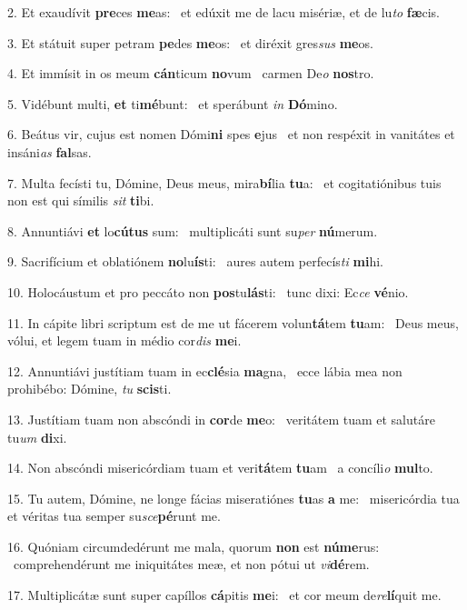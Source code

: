 2. Et exaudívit \textbf{pre}ces \textbf{me}as: \ast\  et edúxit me de lacu misériæ, et de lu\textit{to} \textbf{fæ}cis.\

3. Et státuit super petram \textbf{pe}des \textbf{me}os: \ast\  et diréxit gres\textit{sus} \textbf{me}os.\

4. Et immísit in os meum \textbf{cán}ticum \textbf{no}vum \ast\  carmen De\textit{o} \textbf{nos}tro.\

5. Vidébunt multi, \textbf{et} ti\textbf{mé}bunt: \ast\  et sperábunt \textit{in} \textbf{Dó}mino.\

6. Beátus vir, cujus est nomen Dómi\textbf{ni} spes \textbf{e}jus \ast\  et non respéxit in vanitátes et insáni\textit{as} \textbf{fal}sas.\

7. Multa fecísti tu, Dómine, Deus meus, mira\textbf{bí}lia \textbf{tu}a: \ast\  et cogitatiónibus tuis non est qui símilis \textit{sit} \textbf{ti}bi.\

8. Annuntiávi \textbf{et} lo\textbf{cú}\textbf{tus} sum: \ast\  multiplicáti sunt su\textit{per} \textbf{nú}merum.\

9. Sacrifícium et oblatiónem \textbf{no}lu\textbf{ís}ti: \ast\  aures autem perfecís\textit{ti} \textbf{mi}hi.\

10. Holocáustum et pro peccáto non \textbf{pos}tu\textbf{lás}ti: \ast\  tunc dixi: Ec\textit{ce} \textbf{vé}nio.\

11. In cápite libri scriptum est de me ut fácerem volun\textbf{tá}tem \textbf{tu}am: \ast\  Deus meus, vólui, et legem tuam in médio cor\textit{dis} \textbf{me}i.\

12. Annuntiávi justítiam tuam in ec\textbf{clé}sia \textbf{ma}gna, \ast\  ecce lábia mea non prohibébo: Dómine, \textit{tu} \textbf{scis}ti.\

13. Justítiam tuam non abscóndi in \textbf{cor}de \textbf{me}o: \ast\  veritátem tuam et salutáre tu\textit{um} \textbf{di}xi.\

14. Non abscóndi misericórdiam tuam et veri\textbf{tá}tem \textbf{tu}am \ast\  a concíli\textit{o} \textbf{mul}to.\

15. Tu autem, Dómine, ne longe fácias miseratiónes \textbf{tu}as \textbf{a} me: \ast\  misericórdia tua et véritas tua semper su\textit{sce}\textbf{pé}runt me.\

16. Quóniam circumdedérunt me mala, quorum \textbf{non} est \textbf{nú}\textbf{me}rus: \ast\  comprehendérunt me iniquitátes meæ, et non pótui ut \textit{vi}\textbf{dé}rem.\

17. Multiplicátæ sunt super capíllos \textbf{cá}pitis \textbf{me}i: \ast\  et cor meum de\textit{re}\textbf{lí}quit me.\

